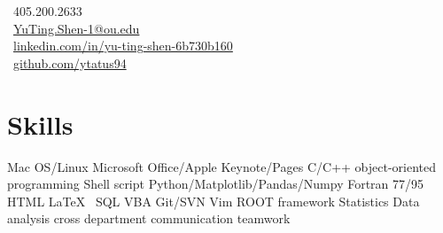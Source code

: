 \documentclass[letterpaper]{deedy-resume-openfont}
\begin{document}
%
%
\lastupdated

%
%

{
    \faPhone \ 405.200.2633\\
    \faEnvelope \ \href{mailto:YuTing.Shen-1@ou.edu}{YuTing.Shen-1@ou.edu}\\
    \faLinkedinSquare \ \href{https://www.linkedin.com/in/yu-ting-shen-6b730b160/}{linkedin.com/in/yu-ting-shen-6b730b160}\\
    \faGithub \ \href{https://github.com/ytatus94}{github.com/ytatus94}
}




\section{Skills}
\raggedright{
	Mac OS/Linux \textbullet{} Microsoft Office/Apple Keynote/Pages \textbullet{} C/C++ \textbullet{} object-oriented programming \textbullet{} Shell script \textbullet{} Python/Matplotlib/Pandas/Numpy \textbullet{} Fortran 77/95 \textbullet{} HTML \textbullet{} \LaTeX\ \textbullet{} SQL \textbullet{} VBA \textbullet{} Git/SVN \textbullet{} Vim \textbullet{} ROOT framework \textbullet{} Statistics \textbullet{} Data analysis \textbullet{} cross department communication \textbullet{} teamwork\\
	}
\sectionsep
\end{document}
